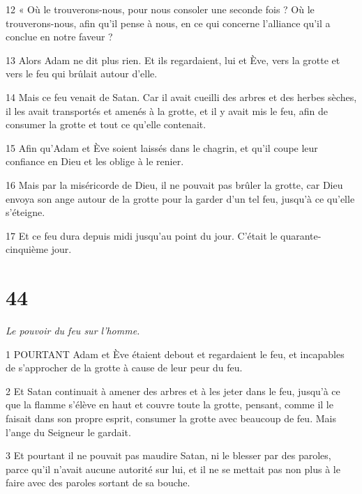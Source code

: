 \par 12 « Où le trouverons-nous, pour nous consoler une seconde fois ? Où le trouverons-nous, afin qu'il pense à nous, en ce qui concerne l'alliance qu'il a conclue en notre faveur ?

\par 13 Alors Adam ne dit plus rien. Et ils regardaient, lui et Ève, vers la grotte et vers le feu qui brûlait autour d'elle.

\par 14 Mais ce feu venait de Satan. Car il avait cueilli des arbres et des herbes sèches, il les avait transportés et amenés à la grotte, et il y avait mis le feu, afin de consumer la grotte et tout ce qu'elle contenait.

\par 15 Afin qu'Adam et Ève soient laissés dans le chagrin, et qu'il coupe leur confiance en Dieu et les oblige à le renier.

\par 16 Mais par la miséricorde de Dieu, il ne pouvait pas brûler la grotte, car Dieu envoya son ange autour de la grotte pour la garder d'un tel feu, jusqu'à ce qu'elle s'éteigne.

\par 17 Et ce feu dura depuis midi jusqu'au point du jour. C'était le quarante-cinquième jour.

\chapter{44}

\par \textit{Le pouvoir du feu sur l'homme.}

\par 1 POURTANT Adam et Ève étaient debout et regardaient le feu, et incapables de s'approcher de la grotte à cause de leur peur du feu.

\par 2 Et Satan continuait à amener des arbres et à les jeter dans le feu, jusqu'à ce que la flamme s'élève en haut et couvre toute la grotte, pensant, comme il le faisait dans son propre esprit, consumer la grotte avec beaucoup de feu. Mais l'ange du Seigneur le gardait.

\par 3 Et pourtant il ne pouvait pas maudire Satan, ni le blesser par des paroles, parce qu'il n'avait aucune autorité sur lui, et il ne se mettait pas non plus à le faire avec des paroles sortant de sa bouche.

